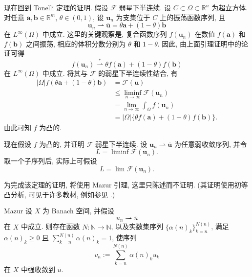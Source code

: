 现在回到 Tonelli 定理的证明. 假设 $\mathcal{F}$ 弱星下半连续. 设 $C\subset\Omega\subset\mathbb{R}^n$ 为超立方体. 对任意 $\bm{a},\bm{b}\in\mathbb{R}^m$, $\theta\in(0,1)$, 设 $\bm{u}_n$ 为支集位于 $C$ 上的振荡函数序列, 且
\begin{equation}\label{eq:tonelli-necessity-two-state-weak-limit}
\bm{u}_n\rightharpoonup\overline{\bm{u}}=\theta\bm{a}+(1-\theta)\bm{b}
\end{equation}
在 $L^\infty(\Omega)$ 中成立. 这里的关键观察是, 复合函数序列 $f(\bm{u}_n)$ 在数值 $f(\bm{a})$ 和 $f(\bm{b})$ 之间振荡, 相应的体积分数分别为 $\theta$ 和 $1-\theta$. 因此, 由上面引理证明中的论证可得
\begin{equation}\label{eq:tonelli-necessity-composite-weak-star-limit}
f(\bm{u}_n)\overset{*}{\rightharpoonup}\theta f(\bm{a})+(1-\theta)f(\bm{b})
\end{equation}
在 $L^\infty(\Omega)$ 中成立. 将其与 $\mathcal{F}$ 的弱星下半连续性结合, 有\[
\begin{aligned}
 |\Omega|f(\theta\bm{a}+(1-\theta)\bm{b})&=\mathcal{F}(\overline{\bm{u}})\\
 &\leq\liminf_{n\to\infty}\mathcal{F}(\bm{u}_n)\\
 &=\lim_{n\to\infty}\int_\Omega f(\bm{u}_n)\\
 &=|\Omega|\{\theta f(\bm{a})+(1-\theta)f(\bm{b})\}.
\end{aligned}
\]由此可知 $f$ 为凸的.

现在假设 $f$ 为凸的, 并证明 $\mathcal{F}$ 弱星下半连续. 设 $\bm{u}_n\rightharpoonup\overline{\bm{u}}$ 为任意弱收敛序列, 并令
\begin{equation}\label{eq:tonelli-sufficiency-liminf-energy}
L=\liminf\mathcal{F}(\bm{u}_n).
\end{equation}
取一个子序列后, 实际上可假设
\begin{equation}\label{eq:tonelli-sufficiency-subsequence-energy-limit}
L=\lim\mathcal{F}(\bm{u}_n).
\end{equation}


为完成该定理的证明, 将使用 Mazur 引理, 这里只陈述而不证明. (其证明使用初等凸分析, 可见于许多教材, 例如参见 \cite{ET}.)

\begin{Lemma}{Mazur}
\label{lem:mazur-strong-convex-combinations}
设 $X$ 为 Banach 空间, 并假设
\begin{equation}\label{eq:mazur-weakly-convergent-sequence}
u_n\rightharpoonup\overline u
\end{equation}
在 $X$ 中成立. 则存在函数 $N:\mathbb{N}\to\mathbb{N}$, 以及实数集序列 $\{\alpha(n)_k\}_{k=n}^{N(n)}$, 满足 $\alpha(n)_k\geq0$ 且 $\sum_{k=n}^{N(n)}\alpha(n)_k=1$, 使序列
\begin{equation}\label{eq:mazur-strongly-convergent-convex-combinations}
v_n:=\sum_{k=n}^{N(n)}\alpha(n)_ku_k
\end{equation}
在 $X$ 中强收敛到 $\overline u$.
\end{Lemma}

